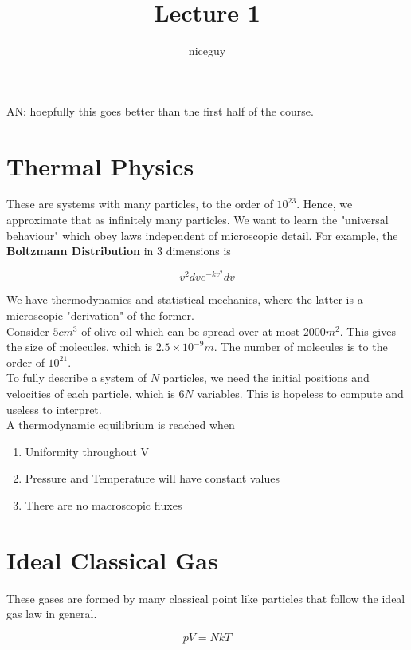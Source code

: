 \documentclass[12pt]{article}
\title{Lecture 1}
\author{niceguy}
\begin{document}
\maketitle

AN: hoepfully this goes better than the first half of the course.

\section{Thermal Physics}

These are systems with many particles, to the order of $10^{23}$. Hence, we approximate that as infinitely many particles. We want to learn the "universal behaviour" which obey laws independent of microscopic detail. For example, the \textbf{Boltzmann Distribution} in 3 dimensions is

$$v^2dve^{-kv^2}dv$$

We have thermodynamics and statistical mechanics, where the latter is a microscopic "derivation" of the former. \\

Consider $5\unit{cm^3}$ of olive oil which can be spread over at most $2000\unit{m^2}$. This gives the size of molecules, which is $2.5\times10^{-9}\unit{m}$. The number of molecules is to the order of $10^{21}$. \\

To fully describe a system of $N$ particles, we need the initial positions and velocities of each particle, which is $6N$ variables. This is hopeless to compute and useless to interpret. \\
A thermodynamic equilibrium is reached when

\begin{enumerate}
	\item Uniformity throughout V
	\item Pressure and Temperature will have constant values
	\item There are no macroscopic fluxes
\end{enumerate}

\section{Ideal Classical Gas}

These gases are formed by many classical point like particles that follow the ideal gas law in general.

$$pV = NkT$$
\end{document}
